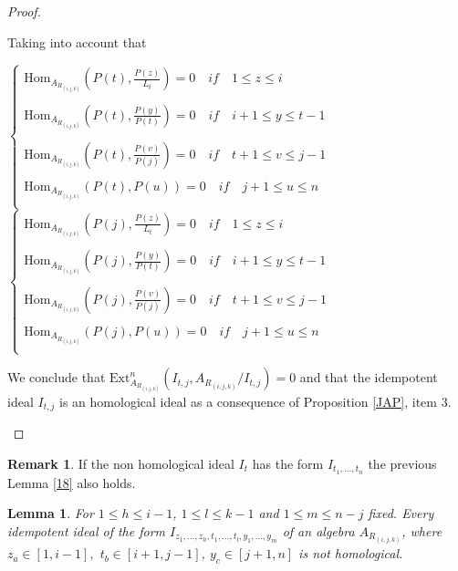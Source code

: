 \documentclass[10pt,twoside]{article}
\newtheorem{lema}{Lemma}
\theoremstyle{definition}
\newtheorem{Nota}{Remark}
\begin{document}
\begin{proof}
\begin{enumerate}
Taking into account that \par\smallskip
\resizebox{11.5cm}{!} {
$ \left\{ \begin{array}{l}
 \textrm{Hom}_{A_{R_{(i, j, k)}}}(P(t),\frac{P(z)}{L_t})=0 \quad if \quad  1 \leq z \leq i   \\
\\ \textrm{Hom}_{A_{R_{(i, j, k)}}}(P(t),\frac{P(y)}{P(t)})=0  \quad if \quad   i+1 \leq y \leq t-1\\
\\  \textrm{Hom}_{A_{R_{(i, j, k)}}}(P(t),\frac{P(v)}{P(j)})=0  \quad if \quad  t+1 \leq v \leq j-1 \\
\\ \textrm{Hom}_{A_{R_{(i, j, k)}}}(P(t),P(u))=0  \quad if \quad   j+1 \leq u \leq n\\
\end{array}
\right.$
$ \left\{ \begin{array}{l}
 \textrm{Hom}_{A_{R_{(i, j, k)}}}(P(j),\frac{P(z)}{L_t})=0 \quad if \quad 1 \leq z \leq i \\
\\ \textrm{Hom}_{A_{R_{(i, j, k)}}}(P(j),\frac{P(y)}{P(t)})=0 \quad if \quad i+1 \leq y \leq t-1\\
\\  \textrm{Hom}_{A_{R_{(i, j, k)}}}(P(j),\frac{P(v)}{P(j)})=0 \quad if \quad t+1 \leq v \leq j-1 \\
\\ \textrm{Hom}_{A_{R_{(i, j, k)}}}(P(j),P(u))=0 \quad if \quad j+1 \leq u \leq n\\
\end{array}
\right.$}

\par\bigskip
We conclude that $\textrm{Ext}^{n}_{A_{R_{(i, j, k)}}}(I_{t, j},A_{R_{(i, j, k)}}/I_{t, j})=0$ and that the idempotent ideal $I_{t, j}$ is an homological ideal as a consequence of Proposition \ref{JAP}, item 3.
\end{enumerate}\end{proof}

\addtocounter{Nota}{6}
\begin{Nota}
If the non homological ideal  $I_t$ has the form $I_{t_1,\ldots, t_n}$ the previous Lemma \ref{18} also holds.
\end{Nota}
\addtocounter{lema}{1}
\begin{lema}\label{main}
For $1\leq h \leq i-1$, $1\leq l \leq k-1$ and $1\leq m \leq n-j$ fixed. Every idempotent ideal of the form $I_{z_1,\ldots,z_h, t_1, \ldots ,t_l, y_1, \ldots , y_m }$  of an algebra $A_{R_{(i, j, k)}}$, where $z_a \in [1,i-1],$ $t_b \in [i+1, j-1]$, $y_c\in [j+1,n]$ is not homological.
\end{lema}
\end{document}
